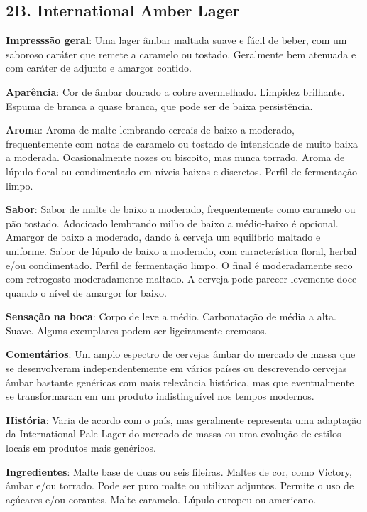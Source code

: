 \subsection*{2B. International Amber Lager}

\textbf{Impresssão geral}: Uma lager âmbar maltada suave e fácil de beber, com um saboroso caráter que remete a caramelo ou tostado. Geralmente bem atenuada e com caráter de adjunto e amargor contido.

\textbf{Aparência}: Cor de âmbar dourado a cobre avermelhado. Limpidez brilhante. Espuma de branca a quase branca, que pode ser de baixa persistência.

\textbf{Aroma}: Aroma de malte lembrando cereais de baixo a moderado, frequentemente com notas de caramelo ou tostado de intensidade de muito baixa a moderada. Ocasionalmente nozes ou biscoito, mas nunca torrado. Aroma de lúpulo floral ou condimentado em níveis baixos e discretos. Perfil de fermentação limpo.

\textbf{Sabor}: Sabor de malte de baixo a moderado, frequentemente como caramelo ou pão tostado. Adocicado lembrando milho de baixo a médio-baixo é opcional. Amargor de baixo a moderado, dando à cerveja um equilíbrio maltado e uniforme. Sabor de lúpulo de baixo a moderado, com característica floral, herbal e/ou condimentado. Perfil de fermentação limpo. O final é moderadamente seco com retrogosto moderadamente maltado. A cerveja pode parecer levemente doce quando o nível de amargor for baixo.

\textbf{Sensação na boca}: Corpo de leve a médio. Carbonatação de média a alta. Suave. Alguns exemplares podem ser ligeiramente cremosos.

\textbf{Comentários}: Um amplo espectro de cervejas âmbar do mercado de massa que se desenvolveram independentemente em vários países ou descrevendo cervejas âmbar bastante genéricas com mais relevância histórica, mas que eventualmente se transformaram em um produto indistinguível nos tempos modernos.

\textbf{História}: Varia de acordo com o país, mas geralmente representa uma adaptação da International Pale Lager do mercado de massa ou uma evolução de estilos locais em produtos mais genéricos.

\textbf{Ingredientes}: Malte base de duas ou seis fileiras. Maltes de cor, como Victory, âmbar e/ou torrado. Pode ser puro malte ou utilizar adjuntos. Permite o uso de açúcares e/ou corantes. Malte caramelo. Lúpulo europeu ou americano.


